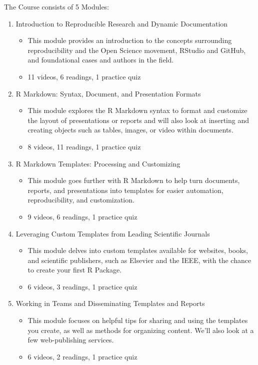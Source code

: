 \documentclass[
]{book}
\providecommand{\tightlist}{%
  \setlength{\itemsep}{0pt}\setlength{\parskip}{0pt}}
\begin{document}
The Course consists of 5 Modules:

\begin{enumerate}
\def\labelenumi{\arabic{enumi}.}
\tightlist
\item
  Introduction to Reproducible Research and Dynamic Documentation

  \begin{itemize}
  \tightlist
  \item
    This module provides an introduction to the concepts surrounding reproducibility and the Open Science movement, RStudio and GitHub, and foundational cases and authors in the field.
  \item
    11 videos, 6 readings, 1 practice quiz
  \end{itemize}
\item
  R Markdown: Syntax, Document, and Presentation Formats

  \begin{itemize}
  \tightlist
  \item
    This module explores the R Markdown syntax to format and customize the layout of presentations or reports and will also look at inserting and creating objects such as tables, images, or video within documents.
  \item
    8 videos, 11 readings, 1 practice quiz
  \end{itemize}
\item
  R Markdown Templates: Processing and Customizing

  \begin{itemize}
  \tightlist
  \item
    This module goes further with R Markdown to help turn documents, reports, and presentations into templates for easier automation, reproducibility, and customization.
  \item
    9 videos, 6 readings, 1 practice quiz
  \end{itemize}
\item
  Leveraging Custom Templates from Leading Scientific Journals

  \begin{itemize}
  \tightlist
  \item
    This module delves into custom templates available for websites, books, and scientific publishers, such as Elsevier and the IEEE, with the chance to create your first R Package.
  \item
    6 videos, 3 readings, 1 practice quiz
  \end{itemize}
\item
  Working in Teams and Disseminating Templates and Reports

  \begin{itemize}
  \tightlist
  \item
    This module focuses on helpful tips for sharing and using the templates you create, as well as methods for organizing content. We'll also look at a few web-publishing services.
  \item
    6 videos, 2 readings, 1 practice quiz
  \end{itemize}
\end{enumerate}
\end{document}
